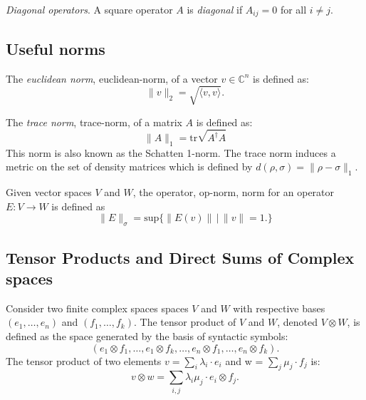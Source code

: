 \begin{definition}
  \emph{Diagonal operators}. A square operator $A$ is \emph{diagonal} if $A_{ij} = 0$ for all $i \neq j$.
\end{definition}


\subsection{Useful norms}

\begin{definition} \label{eq:euclidean_distance}
  The \emph{euclidean norm}, \gls{euclidean-norm}, of a vector $v \in \mathbb{C}^{n} $ is defined as:
  \begin{equation*}
    \lVert v \rVert_{2} = \sqrt{\langle v, v\rangle}. 
    \end{equation*}
\end{definition}

\begin{definition}\label{eq:trace-norm-op}
  The \emph{trace norm}, \gls{trace-norm}, of a matrix $A$ is defined as:
  \begin{equation*}
    \lVert A \rVert_{1} = \text{tr} \sqrt{A^{\dagger}A}
  \end{equation*}
  This norm is also  known as the Schatten 1-norm. The trace norm induces a metric on the set of density matrices which is defined by $d(\rho, \sigma) = \lVert \rho -\sigma\rVert_{1}$.
\end{definition}


\begin{definition} \label{eq:op_norm}
  Given vector spaces $V$ and $W$, the operator, \gls{op-norm}, norm for an operator $E: V \rightarrow W$ is defined as
  \begin{equation*}
  \lVert E \rVert_{\sigma} = \text{sup} \{ \lVert E(v) \rVert \hspace{2pt} | \hspace{2pt} \lVert v \rVert = 1. \}
\end{equation*}
\end{definition}




\subsection {Tensor Products and Direct Sums of Complex spaces}

\begin{definition}
Consider two finite complex spaces spaces $V$ and $W$ with respective bases $(e_1, \ldots , e_n)$ and $(f_1, \ldots , f_k)$. The tensor product of $V$ and $W$, denoted $V \otimes W$, is defined as the space generated by the basis of syntactic symbols:
\begin{equation*}
  (e_1 \otimes f_1, \ldots , e_1 \otimes f_k, \ldots , e_n \otimes f_1, \ldots , e_n \otimes f_k).
\end{equation*}
The tensor product of two elements $v = \sum_i \lambda_i \cdot e_i$ and w = $\sum_j \mu_j \cdot f_j$ is:
\begin{equation*}
  v \otimes w = \sum_{i,j} \lambda_i \mu_j \cdot e_i \otimes f_j.
\end{equation*}
\end{definition}

